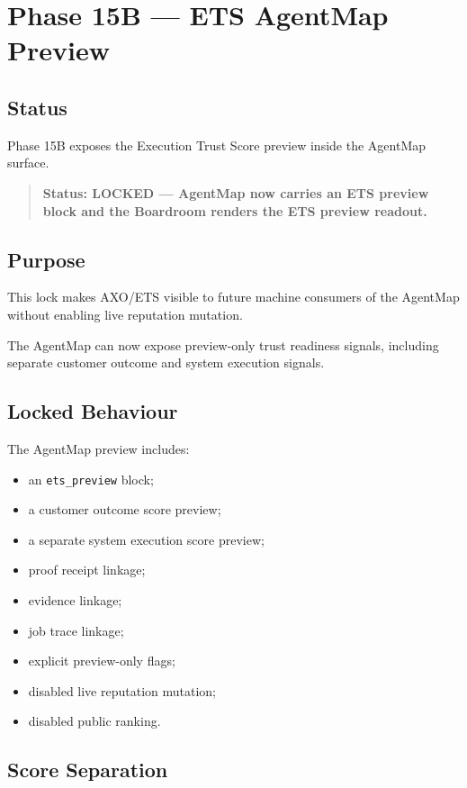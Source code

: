 \section{Phase 15B --- ETS AgentMap Preview}
\label{sec:phase15b-ets-agentmap-preview}

\subsection{Status}

Phase 15B exposes the Execution Trust Score preview inside the AgentMap surface.

\begin{quote}
\textbf{Status: LOCKED --- AgentMap now carries an ETS preview block and the Boardroom renders the ETS preview readout.}
\end{quote}

\subsection{Purpose}

This lock makes AXO/ETS visible to future machine consumers of the AgentMap without enabling live reputation mutation.

The AgentMap can now expose preview-only trust readiness signals, including separate customer outcome and system execution signals.

\subsection{Locked Behaviour}

The AgentMap preview includes:

\begin{itemize}
  \item an \texttt{ets\_preview} block;
  \item a customer outcome score preview;
  \item a separate system execution score preview;
  \item proof receipt linkage;
  \item evidence linkage;
  \item job trace linkage;
  \item explicit preview-only flags;
  \item disabled live reputation mutation;
  \item disabled public ranking.
\end{itemize}

\subsection{Score Separation}

